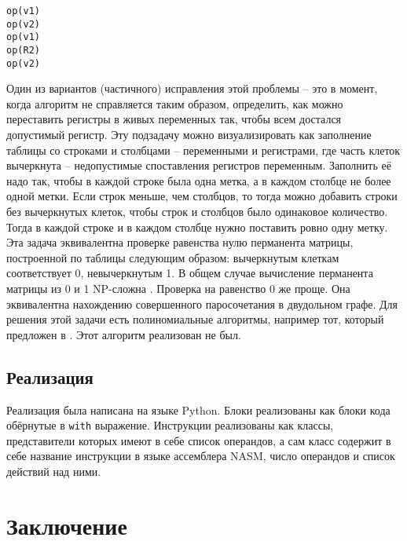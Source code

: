 \documentclass[a4paper,14pt]{extarticle}
\begin{document}
\begin{lstlisting}[caption={Пример кода, в котором алгоритм может не справится}, label=fail_when_possible]
op(v1)
op(v2)
op(v1)
op(R2)
op(v2)
\end{lstlisting}

Один из вариантов (частичного) исправления этой проблемы -- это в момент, когда алгоритм не справляется таким образом,
определить, как можно переставить регистры в живых переменных так, чтобы всем достался допустимый регистр.
Эту подзадачу можно визуализировать как заполнение таблицы со строками и столбцами -- переменными и регистрами,
где часть клеток вычеркнута -- недопустимые споставления регистров переменным.
Заполнить её надо так, чтобы в каждой строке была одна метка, а в каждом столбце не более одной метки.
Если строк меньше, чем столбцов, то тогда можно добавить строки без вычеркнутых клеток, чтобы строк и столбцов было одинаковое количество.
Тогда в каждой строке и в каждом столбце нужно поставить ровно одну метку.
Эта задача эквивалентна проверке равенства нулю перманента матрицы, построенной по таблицы следующим образом:
вычеркнутым клеткам соответствует 0, невычеркнутым 1.
В общем случае вычисление перманента матрицы из 0 и 1 NP-сложна \cite{valiant_complexity_1979}.
Проверка на равенство 0 же проще.
Она эквивалентна нахождению совершенного паросочетания в двудольном графе.
Для решения этой задачи есть полиномиальные алгоритмы, например тот, который предложен в \cite{chandran_practical_2011}.
Этот алгоритм реализован не был.

\subsection{Реализация}
Реализация была написана на языке Python.
Блоки реализованы как блоки кода обёрнутые в \texttt{with} выражение.
Инструкции реализованы как классы, представители которых имеют в себе список операндов,
а сам класс содержит в себе название инструкции в языке ассемблера NASM, число операндов и список действий над ними.

\section{Заключение}

\newpage



\end{document}
